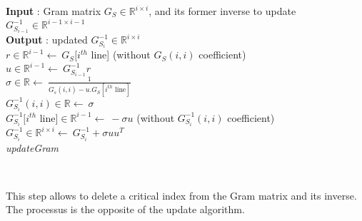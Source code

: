 \documentclass{ipol}
\newcommand{\RR}{\mathbb{R}}
\begin{document}
\begin{algorithm}[H]

\SetLine
\textbf{Input} : Gram matrix $G_S \in \mathbb{R}^{i \times i}$, and its former inverse to update $G_{S_{i-1}}^{-1}\in \mathbb{R}^{i-1 \times i-1}$\\
\textbf{Output} : updated  $G_{S_i}^{-1}\in \mathbb{R}^{i \times i}$\\
$r \in \mathbb{R}^{i-1} \leftarrow \  G_S[i^{th}$ line] (without $G_S(i,i)$ coefficient)\\
$u \in \mathbb{R}^{i-1} \leftarrow \ G_{S_{i-1}}^{-1} r$\\
$\sigma \in \mathbb{R} \leftarrow \ \frac{1}{G_s(i,i) - u.G_S[i^{th} \text{ line}]}$\\
$G_{S_i}^{-1}(i,i) \in \mathbb{R} \leftarrow \ \sigma$\\
$G_{S_i}^{-1}[i^{th}$ line]$\in \mathbb{R}^{i-1} \leftarrow \ -\sigma u$ (without $G_{S_i}^{-1}(i,i)$ coefficient)\\
\Return $G_{S_i}^{-1} \in \RR^{i \times i} \leftarrow \ G_{S_i}^{-1}+\sigma u u^T$\\
\caption{\textit{updateGram}}

\end{algorithm}\\

\newpage

\noindent This step allows to delete a critical index from the Gram matrix and its inverse. The processus is the opposite of the update algorithm.\\
\end{document}
